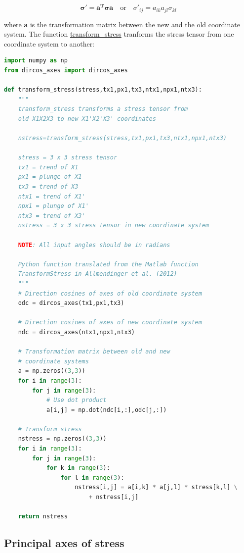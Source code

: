 \documentclass[a4paper , 12pt]{book}
\begin{document}
\begin{equation}
    \boldsymbol{\sigma '}=\mathbf{a}^{\mathbf{T}}\boldsymbol{\sigma}\mathbf{a}\quad \text{or}\quad \sigma'_{ij}=a_{ik}a_{jl}\sigma_{kl}
\end{equation}

where $\mathbf{a}$ is the transformation matrix between the new and the old coordinate system. The function \href{https://github.com/nfcd/compGeo/blob/master/source/functions/transform_stress.py}{transform\_stress} tranforms the stress tensor from one coordinate system to another:

\begin{center}
\begin{lstlisting}[language=Python, frame=single]
import numpy as np
from dircos_axes import dircos_axes

def transform_stress(stress,tx1,px1,tx3,ntx1,npx1,ntx3):
	"""
	transform_stress transforms a stress tensor from
	old X1X2X3 to new X1'X2'X3' coordinates
	
	nstress=transform_stress(stress,tx1,px1,tx3,ntx1,npx1,ntx3)
	
	stress = 3 x 3 stress tensor
	tx1 = trend of X1 
	px1 = plunge of X1 
	tx3 = trend of X3
	ntx1 = trend of X1'
	npx1 = plunge of X1'
	ntx3 = trend of X3'
	nstress = 3 x 3 stress tensor in new coordinate system
	
	NOTE: All input angles should be in radians
	
	Python function translated from the Matlab function
	TransformStress in Allmendinger et al. (2012)
	"""
	# Direction cosines of axes of old coordinate system
	odc = dircos_axes(tx1,px1,tx3)
	
	# Direction cosines of axes of new coordinate system
	ndc = dircos_axes(ntx1,npx1,ntx3)
	
	# Transformation matrix between old and new
	# coordinate systems
	a = np.zeros((3,3))
	for i in range(3):
		for j in range(3):
			# Use dot product
			a[i,j] = np.dot(ndc[i,:],odc[j,:])
	
	# Transform stress
	nstress = np.zeros((3,3))
	for i in range(3):
		for j in range(3):
			for k in range(3):
				for l in range(3):
					nstress[i,j] = a[i,k] * a[j,l] * stress[k,l] \
						+ nstress[i,j]
	
	return nstress
\end{lstlisting}
\end{center}

\subsection{Principal axes of stress}
\end{document}

